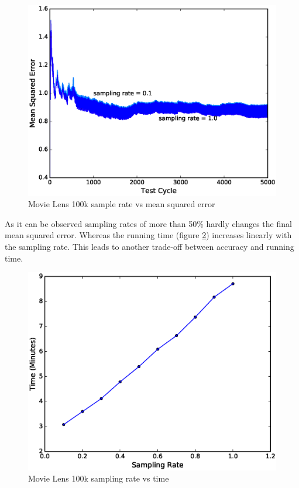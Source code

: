 \documentclass{sig-alternate-05-2015}
\begin{document}
\begin{figure}[H]
\centering
\includegraphics[width=\columnwidth]{../images/experiment-results/movie-lens-100k-sampling-rate.eps}
\caption{Movie Lens 100k sample rate vs mean squared error}
\label{fig:movie-lens-100k-sample-rate}
\end{figure}

As it can be observed sampling rates of more than 50\% hardly changes the final mean squared error. 
Whereas the running time (figure \ref{fig:movie-lens-100k-sample-rate-time}) increases linearly with the sampling rate. 
This leads to another trade-off between accuracy and running time. 

\begin{figure}[H]
\centering
\includegraphics[width=\columnwidth]{../images/experiment-results/movie-lens-100k-sampling-time.eps}
\caption{Movie Lens 100k sampling rate vs time}
\label{fig:movie-lens-100k-sample-rate-time}
\end{figure}
\end{document}
